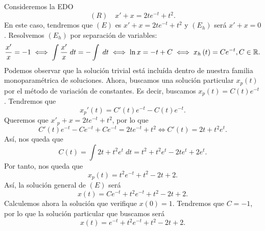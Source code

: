 \begin{eg}
Consideremos la EDO
\[\left(R\right) \quad x' + x = 2te^{-t} + t ^{2} .\]
En este caso, tendremos que $\displaystyle \left(E\right) $ es $\displaystyle x' +x = 2te^{-t}+t ^{2} $ y $\displaystyle \left(E_{h}\right) $ será $\displaystyle x' + x = 0 $. Resolvemos $\displaystyle \left(E_{h}\right) $ por separación de variables:
\[\frac{x'}{x} = -1 \iff \int \frac{x'}{x} \; dt = -\int  \; dt \iff \ln x = -t + C \iff x_{h}\left(t\right) = Ce^{-t}, C \in \mathbb{R} .\]
Podemos observar que la solución trivial está incluída dentro de nuestra familia monoparamétrica de soluciones. Ahora, buscamos una solución particular $\displaystyle x_{p}\left(t\right) $ por el método de variación de constantes. Es decir, buscamos $\displaystyle x_{p}\left(t\right)=C\left(t\right)e^{-t} $. Tendremos que 
\[x_{p}'\left(t\right)= C'\left(t\right)e^{-t}-C\left(t\right)e^{-t}  .\]
Queremos que $\displaystyle x'_{p} + x = 2te^{-t}+t ^{2} $, por lo que 
\[C'\left(t\right)e^{-t}-Ce^{-t} + Ce^{-t} = 2te^{-t} + t ^{2} \iff C'\left(t\right) = 2t + t ^{2}e^{t}.\]
Así, nos queda que 
\[C\left(t\right) = \int 2t + t ^{2}e^{t} \; dt = t ^{2} + t ^{2}e^{t}-2te^{t}+2e^{t} .\]
Por tanto, nos queda que 
\[x_{p}\left(t\right)=t ^{2}e^{-t} + t ^{2}-2t+2 .\]
Así, la solución general de $\displaystyle \left(E\right) $ será
\[x\left(t\right)=Ce^{-t}+t ^{2}e^{-t} + t ^{2}-2t + 2 .\]
Calculemos ahora la solución que verifique $\displaystyle x\left(0\right) = 1 $. Tendremos que $\displaystyle C = -1 $, por lo que la solución particular que buscamos será
\[x\left(t\right)=e^{-t} + t ^{2}e^{-t}+t ^{2}-2t + 2 .\]
\end{eg}
